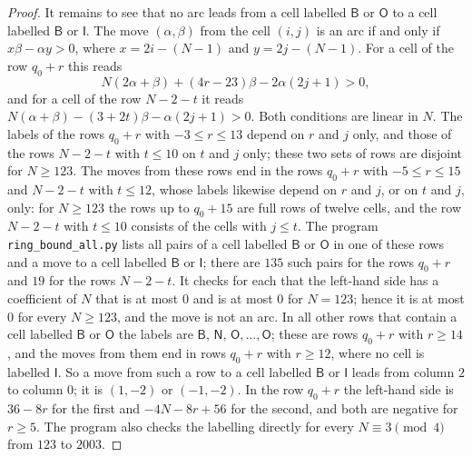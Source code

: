 \documentclass[11pt]{amsart}
\theoremstyle{remark}
\begin{document}
\begin{proof}
It remains to see that no arc leads from a cell labelled $\mathsf B$ or $\mathsf O$ to a cell labelled $\mathsf B$
or $\mathsf I$. The move $(\alpha,\beta)$ from the cell $(i,j)$ is an arc if and only if $x\beta-\alpha y>0$, where
$x=2i-(N-1)$ and $y=2j-(N-1)$. For a cell of the row $q_0+r$ this reads
\[ N(2\alpha+\beta)+(4r-23)\beta-2\alpha(2j+1)>0, \]
and for a cell of the row $N-2-t$ it reads $N(\alpha+\beta)-(3+2t)\beta-\alpha(2j+1)>0$. Both conditions are linear
in $N$. The labels of the rows $q_0+r$ with $-3\le r\le13$ depend on $r$ and $j$ only, and those of the rows
$N-2-t$ with $t\le10$ on $t$ and $j$ only; these two sets of rows are disjoint for $N\ge123$. The moves from these
rows end in the rows $q_0+r$ with $-5\le r\le15$ and $N-2-t$ with $t\le12$, whose labels likewise depend on $r$ and
$j$, or on $t$ and $j$, only: for $N\ge123$ the rows up to $q_0+15$ are full rows of twelve cells, and the row
$N-2-t$ with $t\le10$ consists of the cells with $j\le t$. The program
\texttt{ring\_bound\_all.py} lists all pairs of a cell labelled $\mathsf B$ or $\mathsf O$ in one of these rows and a
move to a cell labelled $\mathsf B$ or $\mathsf I$; there are $135$ such pairs for the rows $q_0+r$ and $19$ for the
rows $N-2-t$. It checks for each that the left-hand side has a coefficient of
$N$ that is at most $0$ and is at most $0$ for $N=123$; hence it is at most $0$ for every $N\ge123$, and the move is
not an arc. In all other rows that contain a cell labelled $\mathsf B$ or $\mathsf O$ the labels are $\mathsf B$,
$\mathsf N$, $\mathsf O,\dots,\mathsf O$; these are rows $q_0+r$ with $r\ge14$, and the moves from them end in rows
$q_0+r$ with $r\ge12$, where no cell is labelled $\mathsf I$. So a move from such a row to a cell labelled
$\mathsf B$ or $\mathsf I$ leads from column $2$ to column $0$; it is $(1,-2)$ or $(-1,-2)$. In the row $q_0+r$ the
left-hand side is $36-8r$ for the first and $-4N-8r+56$ for the second, and both are negative for $r\ge5$. The
program also checks the labelling directly for every $N\equiv3\pmod 4$ from $123$ to $2003$.
\end{proof}
\end{document}
